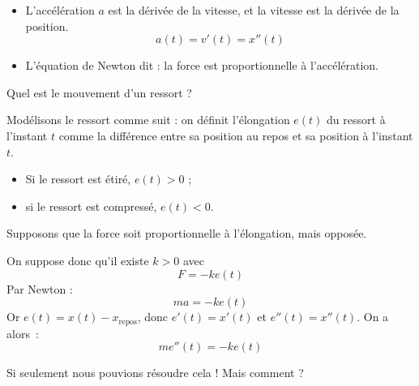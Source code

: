 \begin{frame}%
  \begin{itemize}
  \item L'accélération \(a\) est la dérivée de la vitesse, et la vitesse est la dérivée de la position.
    \begin{equation*}
      a(t) = v'(t) = x''(t)
    \end{equation*}\pause{}
  \item L'équation de Newton dit : la force est proportionnelle à l'accélération.
  \end{itemize}
  \begin{question}
    Quel est le mouvement d'un ressort ?
  \end{question}\pause{}
  \begin{answer}
    Modélisons le ressort comme suit : on définit l'élongation\pause{} \(e(t)\) du ressort à l'instant \(t\) comme la différence entre sa position au repos et sa position à l'instant \(t\).\pause{}
    \begin{itemize}
    \item Si le ressort est étiré, \(e(t) > 0\) ;\pause{}
    \item si le ressort est compressé, \(e(t) < 0\).
    \end{itemize}\pause{}
    Supposons que la force soit proportionnelle à l'élongation, mais opposée.
  \end{answer}
\end{frame}
\begin{frame}%
  \begin{answer}
    On suppose donc qu'il existe \(k > 0\) avec
    \begin{equation*}
      F = -k e(t)
    \end{equation*}\pause{}
    Par Newton :
    \begin{equation*}
      m a = - k e(t)
    \end{equation*}\pause{}
    Or \(e(t) = x(t) - x_{\text{repos}}\),\pause{} donc \(e'(t) = x'(t)\) et \(e''(t) = x''(t)\).\pause{} On a alors~:
    \begin{equation*}
      m e''(t) = -k e(t)
    \end{equation*}\pause{}
  \end{answer}
  \begin{block}{}
    \begin{center}
      Si seulement nous pouvions résoudre cela ! Mais comment ?
    \end{center}
  \end{block}
\end{frame}
